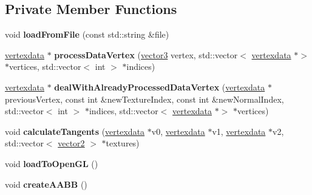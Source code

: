 \subsection*{Private Member Functions}
\begin{DoxyCompactItemize}
\item 
\mbox{\label{classflounder_1_1model_a34c636bee22fcf36fa2a2fcfe0bdadb3}} 
void {\bfseries load\+From\+File} (const std\+::string \&file)
\item 
\mbox{\label{classflounder_1_1model_a24e81bf6b3ec2c428975e6419ebf18ca}} 
\hyperlink{classflounder_1_1vertexdata}{vertexdata} $\ast$ {\bfseries process\+Data\+Vertex} (\hyperlink{classflounder_1_1vector3}{vector3} vertex, std\+::vector$<$ \hyperlink{classflounder_1_1vertexdata}{vertexdata} $\ast$$>$ $\ast$vertices, std\+::vector$<$ int $>$ $\ast$indices)
\item 
\mbox{\label{classflounder_1_1model_a2a5bafcc900a83c0add5b20d3f6ee0c0}} 
\hyperlink{classflounder_1_1vertexdata}{vertexdata} $\ast$ {\bfseries deal\+With\+Already\+Processed\+Data\+Vertex} (\hyperlink{classflounder_1_1vertexdata}{vertexdata} $\ast$previous\+Vertex, const int \&new\+Texture\+Index, const int \&new\+Normal\+Index, std\+::vector$<$ int $>$ $\ast$indices, std\+::vector$<$ \hyperlink{classflounder_1_1vertexdata}{vertexdata} $\ast$$>$ $\ast$vertices)
\item 
\mbox{\label{classflounder_1_1model_ad8eafa9f1c1afde95f7b4035a7e83f59}} 
void {\bfseries calculate\+Tangents} (\hyperlink{classflounder_1_1vertexdata}{vertexdata} $\ast$v0, \hyperlink{classflounder_1_1vertexdata}{vertexdata} $\ast$v1, \hyperlink{classflounder_1_1vertexdata}{vertexdata} $\ast$v2, std\+::vector$<$ \hyperlink{classflounder_1_1vector2}{vector2} $>$ $\ast$textures)
\item 
\mbox{\label{classflounder_1_1model_acf5f1c0df19c406ff98214b376e0d997}} 
void {\bfseries load\+To\+Open\+GL} ()
\item 
\mbox{\label{classflounder_1_1model_adc9de7f0f5a067bd1d1a775986bd3578}} 
void {\bfseries create\+A\+A\+BB} ()
\end{DoxyCompactItemize}


